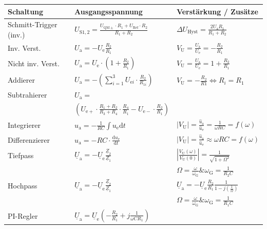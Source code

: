 		\begin{table}[h]
		\begin{tabularx}{\textwidth}{XXX}
		Schaltung & Ausgangsspannung & Verstärkung / Zusätze\\
		\toprule
		Schmitt-Trigger (inv.) & $U_{\mathrm{S}1,2}=\frac{U_{\mathrm{QM}\pm}\cdot R_1+U_{\mathrm{Ref}}\cdot R_2}{R_1+R_2}$
		& $\Delta U_{\mathrm{Hyst}}=\frac{2U_{\mathrm{a}}R_1}{R_1+R_2}$\\
		\midrule
		Inv. Verst. & $U_{\mathrm{a}}=-U_{\mathrm{e}}\frac{R_2}{R_1}$ 
		& $V_{\mathrm{U}}=\frac{U_{\mathrm{a}}}{U_{\mathrm{e}}}=-\frac{R_2}{R_1}$\\
		\midrule
		Nicht inv. Verst. & $U_{\mathrm{a}}=U_{\mathrm{e}}\cdot\left(1+\frac{R_2}{R_1}\right)$ 
		& $V_{\mathrm{U}}=\frac{U_{\mathrm{a}}}{U_{\mathrm{e}}}=1+\frac{R_2}{R_1}$\\
		\midrule
		Addierer & $U_{\mathrm{a}}=-\left(\sum_{i=1}^3 U_{\mathrm{e}i}\cdot\frac{R_2}{R_{1i}}\right)$ 
		& $V_{\mathrm{U}}=-\frac{R_2}{R1} \Leftrightarrow R_i=R_1$\\
		\midrule
		Subtrahierer & $U_{\mathrm{a}}=$ & \\
		& $\left(U_{\mathrm{e}+}\cdot\frac{R_1+R_2}{R_3+R_4}\cdot\frac{R_4}{R_1}-U_{\mathrm{e}-}\cdot\frac{R_2}{R_1}\right)$ &\\
		\midrule
		Integrierer & $u_{\mathrm{a}}=-\frac{1}{RC}\int u_{\mathrm{e}} \mathrm{d}t$ 
		& $|V_{\mathrm{U}}|=\frac{\hat{u}_{\mathrm{a}}}{\hat{u}_{\mathrm{e}}}=\frac{1}{\omega RC}=f(\omega)$\\
		\midrule
		Differenzierer & $u_{\mathrm{a}}=-RC\cdot\frac{\mathrm{d}u_{\mathrm{e}}}{\mathrm{d}t}$ &
		$|V_{\mathrm{U}}|=\frac{\hat{u}_{\mathrm{a}}}{\hat{u}_{\mathrm{e}}}\approx\omega RC=f(\omega)$\\
		\midrule
		Tiefpass & $\underline{U}_{\mathrm{a}}=-\underline{U}_{\mathrm{e}}\frac{\underline{Z}_2}{\underline{Z}_1}$ 
		& $\left|\frac{V_{\mathrm{U}}(\omega)}{V_{\mathrm{U}}(0)}\right|=\frac{1}{\sqrt{1+\Omega^2}}$\\
		& & $\Omega=\frac{\omega}{\omega_{\mathrm{G}}} \& \omega_{\mathrm{G}}=\frac{1}{R_2C}$\\
		\midrule
		Hochpass & $\underline{U}_{\mathrm{a}}=-\underline{U}_{\mathrm{e}}\frac{\underline{Z}_2}{\underline{Z}_1}$ 
		& $\underline{U}_{\mathrm{a}}=-\underline{U}_{\mathrm{e}}\frac{R_2}{R_1}\frac{1}{1-j\left(\frac{1}{\Omega}\right)}$ \\
		& & $\Omega=\frac{\omega}{\omega_{\mathrm{G}}}\&\omega_{\mathrm{G}}=\frac{1}{R_1C}$ \\
		\midrule
		PI-Regler & $\underline{U}_{\mathrm{a}}=\underline{U}_{\mathrm{e}}\left(-\frac{R_2}{R_1}+j\frac{1}{\omega C R_1}\right)$ &\\
		\bottomrule
		\end{tabularx}
		\end{table}

